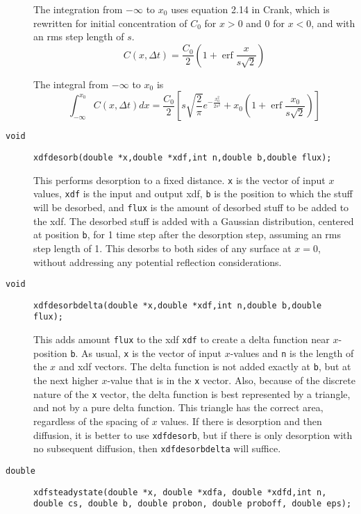 \documentclass[11pt]{article}
\newcommand {\ttt} {\texttt}
\DeclareMathOperator{\erf}{erf}
\begin{document}
\begin{description}
The integration from $-\infty$ to $x_0$ uses equation 2.14 in Crank, which is rewritten for initial concentration of $C_0$ for $x > 0$ and 0 for $x < 0$, and with an rms step length of $s$.
$$C(x,\Delta t) = \frac{C_0}{2} \left( 1+ \erf \frac{x}{s\sqrt{2}} \right)$$

The integral from $-\infty$ to $x_0$ is
$$\int_{-\infty}^{x_0} C(x,\Delta t) dx = \frac{C_0}{2} \left[s \sqrt{\frac{2}{\pi}}e^{-\frac{x_0^2}{2s^2}} + x_0 \left(1+ \erf \frac{x_0}{s\sqrt{2}} \right) \right]$$


\item[\ttt{void}] 
\ttt{xdfdesorb(double *x,double *xdf,int n,double b,double flux);}

This performs desorption to a fixed distance. \ttt{x} is the vector of input $x$ values, \ttt{xdf} is the input and output xdf, \ttt{b} is the position to which the stuff will be desorbed, and \ttt{flux} is the amount of desorbed stuff to be added to the xdf. The desorbed stuff is added with a Gaussian distribution, centered at position \ttt{b}, for 1 time step after the desorption step, assuming an rms step length of 1. This desorbs to both sides of any surface at $x = 0$, without addressing any potential reflection considerations.


\item[\ttt{void}] 
\ttt{xdfdesorbdelta(double *x,double *xdf,int n,double b,double flux);}

This adds amount \ttt{flux} to the xdf \ttt{xdf} to create a delta function near $x$-position \ttt{b}. As usual, \ttt{x} is the vector of input $x$-values and \ttt{n} is the length of the $x$ and xdf vectors. The delta function is not added exactly at \ttt{b}, but at the next higher $x$-value that is in the \ttt{x} vector. Also, because of the discrete nature of the \ttt{x} vector, the delta function is best represented by a triangle, and not by a pure delta function. This triangle has the correct area, regardless of the spacing of $x$ values. If there is desorption and then diffusion, it is better to use \ttt{xdfdesorb}, but if there is only desorption with no subsequent diffusion, then \ttt{xdfdesorbdelta} will suffice.


\item[\ttt{double}]
\ttt{xdfsteadystate(double *x, double *xdfa, double *xdfd,int n, double cs, double b, double probon, double proboff, double eps);}


\end{description}
\end{document}
